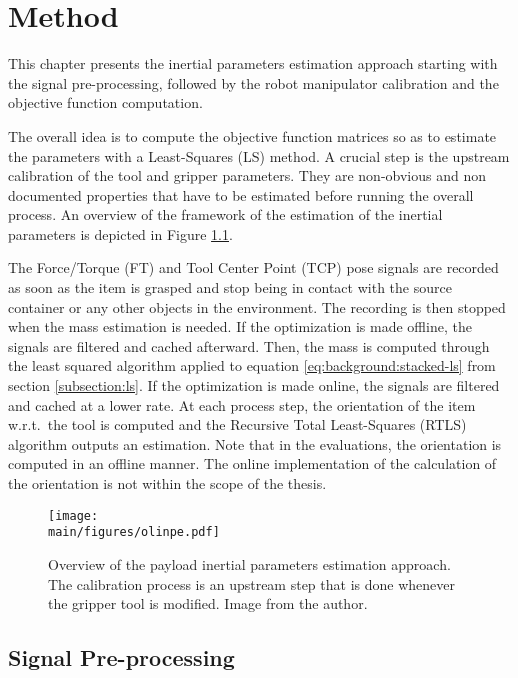 \documentclass[/home/francois/latex/report/main.tex]{subfiles}
\begin{document}
\chapter{Method}
\label{chapter:method}

This chapter presents the inertial parameters estimation approach starting with the signal pre-processing, followed by the robot manipulator calibration and the objective function computation.

The overall idea is to compute the objective function matrices so as to estimate the parameters with a Least-Squares (LS) method. A crucial step is the upstream calibration of the tool and gripper parameters. They are non-obvious and non documented properties that have to be estimated before running the overall process. An overview of the framework of the estimation of the inertial parameters is depicted in Figure \ref{fig:method:overall}.

The Force/Torque (FT) and Tool Center Point (TCP) pose signals are recorded as soon as the item is grasped and stop being in contact with the source container or any other objects in the environment. The recording is then stopped when the mass estimation is needed. If the optimization is made offline, the signals are filtered and cached afterward. Then, the mass is computed through the least squared algorithm applied to equation \ref{eq:background:stacked-ls} from section \ref{subsection:ls}. If the optimization is made online, the signals are filtered and cached at a lower rate. At each process step, the orientation of the item w.r.t.\ the tool is computed and the Recursive Total Least-Squares (RTLS) algorithm outputs an estimation. Note that in the evaluations, the orientation is computed in an offline manner. The online implementation of the calculation of the orientation is not within the scope of the thesis.

\begin{figure}[h]
  \centering
  \texttt{[image: \\main/figures/olinpe.pdf]}
  \caption{Overview of the payload inertial parameters estimation approach. The calibration process is an upstream step that is done whenever the gripper tool is modified. Image from  the author.}
  \label{fig:method:overall}
\end{figure}

\section{Signal Pre-processing}
\label{section:pre-pro}
\end{document}
